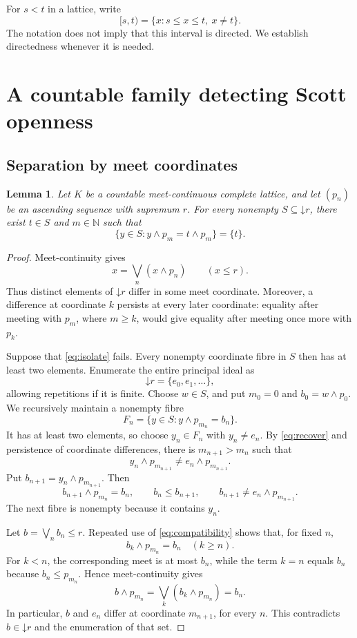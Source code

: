 \documentclass[preprint,11pt]{elsarticle}
\newtheorem{lemma}[theorem]{Lemma}
\theoremstyle{definition}
\theoremstyle{remark}
\numberwithin{equation}{section}
\newcommand{\N}{\mathbb N}
\newcommand{\down}[1]{\mathord{\downarrow}#1}
\newcommand{\mc}{\wedge}
\begin{document}
For $s<t$ in a lattice, write
\[
 [s,t)=\{x:s\le x\le t,\ x\ne t\}.
\]
The notation does not imply that this interval is directed. We establish directedness whenever it is needed.

\section{A countable family detecting Scott openness}
\subsection{Separation by meet coordinates}
\begin{lemma}\label{lem:isolation}
Let $K$ be a countable meet-continuous complete lattice, and let $(p_n)$ be an ascending sequence with supremum $r$. For every nonempty $S\subseteq\down r$, there exist $t\in S$ and $m\in\N$ such that
\begin{equation}\label{eq:isolate}
 \{y\in S:y\mc p_m=t\mc p_m\}=\{t\}.
\end{equation}
\end{lemma}
\begin{proof}
Meet-continuity gives
\begin{equation}\label{eq:recover}
 x=\bigvee_n(x\mc p_n)\qquad(x\le r).
\end{equation}
Thus distinct elements of $\down r$ differ in some meet coordinate. Moreover, a difference at coordinate $k$ persists at every later coordinate: equality after meeting with $p_m$, where $m\ge k$, would give equality after meeting once more with $p_k$.

Suppose that \eqref{eq:isolate} fails. Every nonempty coordinate fibre in $S$ then has at least two elements. Enumerate the entire principal ideal as
\[
 \down r=\{e_0,e_1,\ldots\},
\]
allowing repetitions if it is finite. Choose $w\in S$, and put $m_0=0$ and $b_0=w\mc p_0$. We recursively maintain a nonempty fibre
\[
 F_n=\{y\in S:y\mc p_{m_n}=b_n\}.
\]
It has at least two elements, so choose $y_n\in F_n$ with $y_n\ne e_n$. By \eqref{eq:recover} and persistence of coordinate differences, there is $m_{n+1}>m_n$ such that
\[
 y_n\mc p_{m_{n+1}}\ne e_n\mc p_{m_{n+1}}.
\]
Put $b_{n+1}=y_n\mc p_{m_{n+1}}$. Then
\begin{equation}\label{eq:compatibility}
 b_{n+1}\mc p_{m_n}=b_n,\qquad
 b_n\le b_{n+1},\qquad
 b_{n+1}\ne e_n\mc p_{m_{n+1}}.
\end{equation}
The next fibre is nonempty because it contains $y_n$.

Let $b=\bigvee_n b_n\le r$. Repeated use of \eqref{eq:compatibility} shows that, for fixed $n$,
\[
 b_k\mc p_{m_n}=b_n\quad(k\ge n).
\]
For $k<n$, the corresponding meet is at most $b_n$, while the term $k=n$ equals $b_n$ because $b_n\le p_{m_n}$. Hence meet-continuity gives
\begin{equation}\label{eq:limitrecover}
 b\mc p_{m_n}=\bigvee_k(b_k\mc p_{m_n})=b_n.
\end{equation}
In particular, $b$ and $e_n$ differ at coordinate $m_{n+1}$, for every $n$. This contradicts $b\in\down r$ and the enumeration of that set.
\end{proof}
\end{document}
